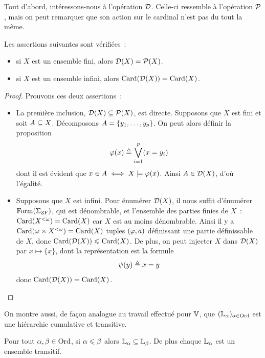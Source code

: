 Tout d'abord, intéressons-nous à l'opération $\mathcal{D}$. Celle-ci ressemble
à l'opération $\mathcal{P}$, mais on peut remarquer que son action sur le cardinal
n'est pas du tout la même.

\begin{proposition}
  Les assertions suivantes sont vérifiées~:
  \begin{itemize}
  \item si $X$ est un ensemble fini, alors $\mathcal{D}(X) = \mathcal{P}(X)$.
  \item si $X$ est un ensemble infini, alors $\operatorname{Card}(\mathcal{D}(X)) = \operatorname{Card}(X)$.
  \end{itemize}
\end{proposition}

\begin{proof}
  Prouvons ces deux assertions~:
  \begin{itemize}
  \item La première inclusion, $\mathcal{D}(X)\subseteq\mathcal{P}(X)$, est directe.
    Supposons que $X$ est fini et soit $A\subseteq X$. Décomposons
    $A = \{y_1,\ldots,y_p\}$. On peut alors définir la proposition
    \[\varphi(x) \triangleq \bigvee_{i = 1}^p (x = y_i)\]
    dont il est évident que $x \in A \iff X \models \varphi(x)$. Ainsi
    $A\in \mathcal{D}(X)$, d'où l'égalité.
  \item Supposons que $X$ est infini. Pour énumérer $\mathcal{D}(X)$, il nous
    suffit d'énumérer $\operatorname{Form}(\Sigma_{\operatorname{ZF}})$, qui est dénombrable, et
    l'ensemble des parties finies de $X$~: $\operatorname{Card}(X^{<\omega}) = \operatorname{Card}(X)$ car
    $X$ est au moins dénombrable. Ainsi il y a
    $\operatorname{Card}(\omega \times X^{<\omega}) = \operatorname{Card}(X)$ tuples $(\varphi,\overline{a})$ définissant
    une partie définissable de $X$, donc $\operatorname{Card}(\mathcal{D}(X))\leqslant \operatorname{Card}(X)$.
    De plus, on peut injecter $X$ dans $\mathcal{D}(X)$ par $x\mapsto \{x\}$, dont
    la représentation est la formule
    \[\psi(y) \triangleq x = y \]
    donc $\operatorname{Card}(\mathcal{D}(X)) = \operatorname{Card}(X)$.\qedhere
  \end{itemize}
\end{proof}

On montre aussi, de façon analogue au travail effectué pour $\mathbb V$, que
$(\mathbb L_{\alpha})_{\alpha \in \operatorname{Ord}}$ est une hiérarchie cumulative et transitive.

\begin{proposition}
  Pour tout $\alpha,\beta \in \operatorname{Ord}$, si $\alpha \leqslant \beta$ alors
  $\mathbb L_{\alpha} \subseteq \mathbb L_\beta$. De plus chaque $\mathbb L_\alpha$ est un ensemble
  transitif.
\end{proposition}

